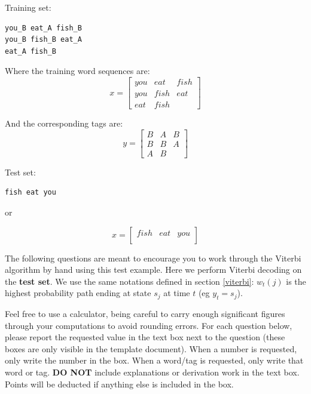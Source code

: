 \documentclass{article}
\begin{document}
Training set:
\begin{verbatim}
you_B eat_A fish_B
you_B fish_B eat_A
eat_A fish_B
\end{verbatim}

Where the training word sequences are:
$$
x= 
\begin{bmatrix}
you & eat & fish\\
you & fish & eat\\
eat & fish &
\end{bmatrix}
$$

And the corresponding tags are:
$$
y= 
\begin{bmatrix}
B & A & B\\
B & B & A\\
A & B &
\end{bmatrix}
$$


Test set:
\begin{verbatim}
fish eat you
\end{verbatim}

or 

$$
x= 
\begin{bmatrix}
fish & eat & you\\
\end{bmatrix}
$$

The following questions are meant to encourage you to work through the Viterbi algorithm by hand using this test example. Here we perform Viterbi decoding on the \textbf{test set}. We use the same notations defined in section \ref{viterbi}: $w_t(j)$ is the highest probability path ending at state $s_j$ at time $t$ (eg $y_t = s_j$).

Feel free to use a calculator, being careful to carry enough significant figures through your computations to avoid rounding errors. For each question below, please report the requested value in the text box next to the question (these boxes are only visible in the template document). When a number is requested, only write the number in the box. When a word/tag is requested, only write that word or tag. \textbf{DO NOT} include explanations or derivation work in the text box. Points will be deducted if anything else is included in the box.
\end{document}

